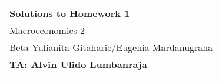 \documentclass[letter,11pt]{article}
\begin{document}
\thispagestyle{empty} %
\begin{tabular}{p{17cm}} %
{\large \bf Solutions to Homework 1} \\
Macroeconomics 2 \\ Beta Yulianita Gitaharie/Eugenia Mardanugraha  \\ {\bf{TA: Alvin Ulido Lumbanraja}}\\
\hline %
\\
\end{tabular} %
\end{document}
